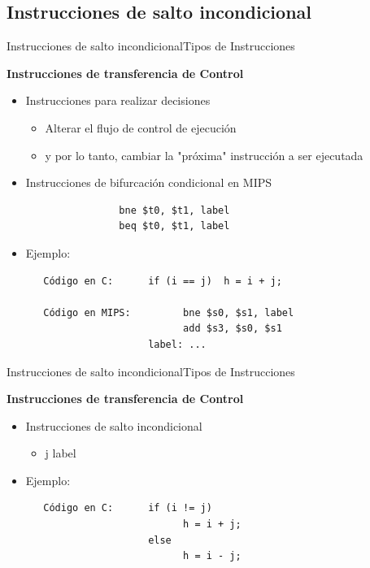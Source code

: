 \documentclass[aspectratio=169,compress]{beamer}
\begin{document}
\begin{footnotesize}
\subsection{Instrucciones de salto incondicional}


\begin{frame}[fragile]{Instrucciones de salto incondicional}{Tipos de Instrucciones}
\begin{center}\textbf{Instrucciones de transferencia de Control}\end{center}

\begin{itemize}
\item Instrucciones para realizar decisiones
\begin{itemize}
\item Alterar el flujo de control de ejecución
\item y por lo tanto, cambiar la "próxima" instrucción a ser ejecutada
\end{itemize}
\item Instrucciones de bifurcación condicional en MIPS
\begin{verbatim}
                bne $t0, $t1, label
                beq $t0, $t1, label
\end{verbatim}
\item Ejemplo:
\begin{verbatim}
   Código en C:      if (i == j)  h = i + j;

   Código en MIPS:         bne $s0, $s1, label
                           add $s3, $s0, $s1
                     label: ...
\end{verbatim}
\end{itemize}
\end{frame}




\begin{frame}[fragile]{Instrucciones de salto incondicional}{Tipos de Instrucciones}
\begin{center}\textbf{Instrucciones de transferencia de Control}\end{center}

\begin{itemize}
\item Instrucciones de salto incondicional
\begin{itemize}
\item j  label
\end{itemize}
\item Ejemplo:
\begin{verbatim}
   Código en C:      if (i != j)  
                           h = i + j;
                     else
                           h = i - j;



\end{verbatim}
\end{itemize}
\end{frame}
\end{footnotesize}
\end{document}
